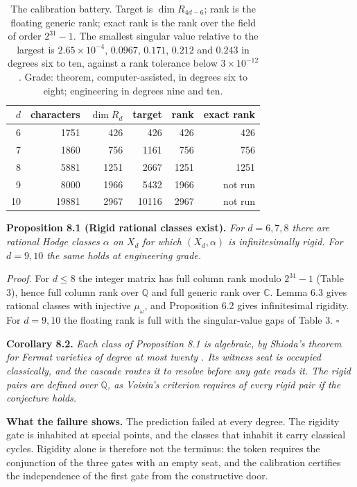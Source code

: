 \documentclass[10pt,twocolumn]{article}
\begin{document}
\begin{table}[tbp]
\centering
\footnotesize
\setlength{\tabcolsep}{4pt}
\caption{The calibration battery. Target is $\dim R_{4d-6}$; rank is the floating generic rank; exact rank is the rank over the field of order $2^{31}-1$. The smallest singular value relative to the largest is $2.65\times10^{-4}$, $0.0967$, $0.171$, $0.212$ and $0.243$ in degrees six to ten, against a rank tolerance below $3\times 10^{-12}$. Grade: theorem, computer-\hspace{0pt}assisted, in degrees six to eight; engineering in degrees nine and ten.}
\begin{tabular}{@{}rrrrrr@{}}
\toprule
$d$ & characters & $\dim R_d$ & target & rank & exact rank \\
\midrule
6 & 1751 & 426 & 426 & 426 & 426 \\
7 & 1860 & 756 & 1161 & 756 & 756 \\
8 & 5881 & 1251 & 2667 & 1251 & 1251 \\
9 & 8000 & 1966 & 5432 & 1966 & not run \\
10 & 19881 & 2967 & 10116 & 2967 & not run \\
\bottomrule
\end{tabular}
\end{table}

\textbf{Proposition 8.1 (Rigid rational classes exist).} \emph{For
\(d=6,7,8\) there are rational Hodge classes \(\alpha\) on \(X_d\) for
which \((X_d,\alpha)\) is infinitesimally rigid. For \(d=9,10\) the same
holds at engineering grade.}

\emph{Proof.} For \(d\le 8\) the integer matrix has full column rank
modulo \(2^{31}-1\) (Table 3), hence full column rank over
\(\mathbb{Q}\) and full generic rank over \(\mathbb{C}\). Lemma 6.3
gives rational classes with injective \(\mu_\omega\), and Proposition
6.2 gives infinitesimal rigidity. For \(d=9,10\) the floating rank is
full with the singular-value gaps of Table 3. \(\square\)

\textbf{Corollary 8.2.} \emph{Each class of Proposition 8.1 is
algebraic, by Shioda's theorem for Fermat varieties of degree at most
twenty \cite{shioda1979,dasilva2021}. Its witness seat is occupied
classically, and the cascade routes it to resolve before any gate reads
it. The rigid pairs are defined over \(\mathbb{Q}\), as Voisin's
criterion requires of every rigid pair if the conjecture holds.}

\textbf{What the failure shows.} The prediction failed at every degree.
The rigidity gate is inhabited at special points, and the classes that
inhabit it carry classical cycles. Rigidity alone is therefore not the
terminus: the token requires the conjunction of the three gates with an
empty seat, and the calibration certifies the independence of the first
gate from the constructive door.
\end{document}
